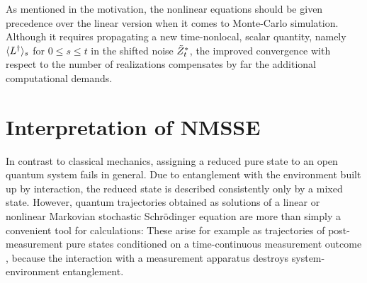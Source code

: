 As mentioned in the motivation, the nonlinear equations should be given precedence over the linear version when it comes to Monte-Carlo simulation.
Although it requires propagating a new time-nonlocal, scalar quantity, namely $\langle L^\dagger \rangle_s$ for $0 \le s \le t$ in the shifted noise ${\tilde Z}^*_t$, the improved convergence with respect to the number of realizations compensates by far the additional computational demands.

\section{Interpretation of NMSSE}
\label{sec:nmqsd.interpretation}
%


In contrast to classical mechanics, assigning a reduced pure state to an open quantum system fails in general.
Due to entanglement with the environment built up by interaction, the reduced state is described consistently only by a mixed state.
However, quantum trajectories obtained as solutions of a linear or nonlinear Markovian stochastic Schrödinger equation are more than simply a convenient tool for calculations:
These arise for example as trajectories of post-measurement pure states conditioned on a time-continuous measurement outcome \cite{Ca93_quantum_optics,BaGr09_trajectories}, because the interaction with a measurement apparatus destroys system-environment entanglement.

